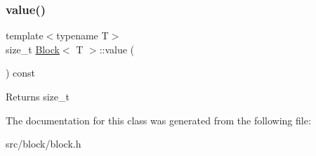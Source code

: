 \subsubsection{\texorpdfstring{value()}{value()}}
{\footnotesize\ttfamily template$<$typename T$>$ \\
size\+\_\+t \mbox{\hyperlink{class_block}{Block}}$<$ T $>$\+::value (\begin{DoxyParamCaption}{ }\end{DoxyParamCaption}) const\hspace{0.3cm}{\ttfamily [inline]}}

\begin{DoxyReturn}{Returns}
size\+\_\+t 
\end{DoxyReturn}


The documentation for this class was generated from the following file\+:\begin{DoxyCompactItemize}
\item 
src/block/block.\+h\end{DoxyCompactItemize}

